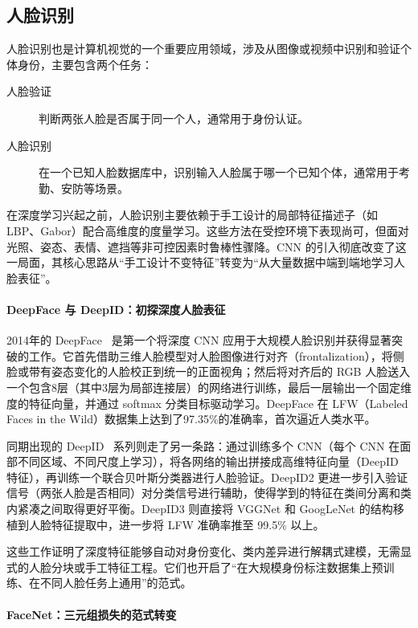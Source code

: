 \subsection{人脸识别}

人脸识别也是计算机视觉的一个重要应用领域，涉及从图像或视频中识别和验证个体身份，主要包含两个任务：
\begin{description}
    \item[人脸验证] 判断两张人脸是否属于同一个人，通常用于身份认证。
    \item[人脸识别] 在一个已知人脸数据库中，识别输入人脸属于哪一个已知个体，通常用于考勤、安防等场景。 
\end{description}

在深度学习兴起之前，人脸识别主要依赖于手工设计的局部特征描述子（如 LBP、Gabor）配合高维度的度量学习。这些方法在受控环境下表现尚可，但面对光照、姿态、表情、遮挡等非可控因素时鲁棒性骤降。CNN 的引入彻底改变了这一局面，其核心思路从“手工设计不变特征”转变为“从大量数据中端到端地学习人脸表征”。

\paragraph{DeepFace 与 DeepID：初探深度人脸表征}

2014年的 DeepFace~\cite{2014DeepFace} 是第一个将深度 CNN 应用于大规模人脸识别并获得显著突破的工作。它首先借助三维人脸模型对人脸图像进行对齐（frontalization），将侧脸或带有姿态变化的人脸校正到统一的正面视角；然后将对齐后的 RGB 人脸送入一个包含8层（其中3层为局部连接层）的网络进行训练，最后一层输出一个固定维度的特征向量，并通过 softmax 分类目标驱动学习。DeepFace 在 LFW（Labeled Faces in the Wild）数据集上达到了97.35\%的准确率，首次逼近人类水平。

同期出现的 DeepID~\cite{ouyang2015deepidnetdeformabledeepconvolutional} 系列则走了另一条路：通过训练多个 CNN（每个 CNN 在面部不同区域、不同尺度上学习），将各网络的输出拼接成高维特征向量（DeepID 特征），再训练一个联合贝叶斯分类器进行人脸验证。DeepID2 更进一步引入验证信号（两张人脸是否相同）对分类信号进行辅助，使得学到的特征在类间分离和类内紧凑之间取得更好平衡。DeepID3 则直接将 VGGNet 和 GoogLeNet 的结构移植到人脸特征提取中，进一步将 LFW 准确率推至 99.5\% 以上。

这些工作证明了深度特征能够自动对身份变化、类内差异进行解耦式建模，无需显式的人脸分块或手工特征工程。它们也开启了“在大规模身份标注数据集上预训练、在不同人脸任务上通用”的范式。

\paragraph{FaceNet：三元组损失的范式转变}

